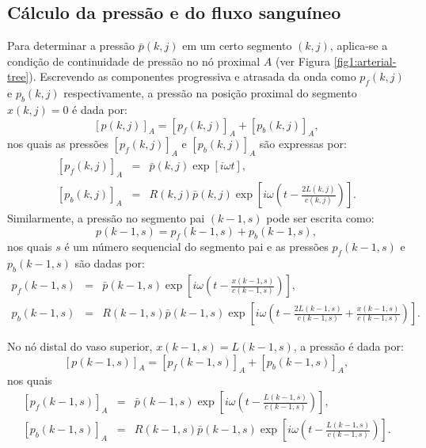 \documentclass[
        english,			
        brazil			        %
        ,<...>]{abntbibufjf}
\begin{document}
\subsection{Cálculo da pressão e do fluxo sanguíneo}\label{sec:pressao-fluxo}

Para determinar a pressão $\bar{p} (k,j)$ em um certo segmento $(k,j)$, aplica-se a condição de continuidade de pressão no nó proximal $A$ (ver Figura \ref{fig1:arterial-tree}). Escrevendo as componentes progressiva e atrasada da onda como $p_f (k,j)$ e $p_b (k,j)$ respectivamente, a pressão na posição proximal do segmento  $x(k,j) = 0$ é dada por:
\begin{equation}
\left[ p (k,j) \right]_A = \left[ p_f (k,j) \right]_A + \left[ p_b (k,j)\right]_A,
\label{09_p}
\end{equation}
nos quais as pressões $\left[ p_f(k,j) \right]_A$ e $\left[ p_b(k,j) \right]_A$ são expressas por:
\begin{eqnarray}
\left[ p_f(k,j) \right]_A &=& \bar{p}(k,j)\exp\left[ i\omega t\right],
\label{10_p_f}\\
\left[ p_b (k,j) \right]_A &=& R(k,j)\bar{p}(k,j)\exp\left[i\omega \left(t - \frac{2L(k,j)}{c(k,j)}\right) \right].
\label{11_p_b}
\end{eqnarray}
Similarmente, a pressão no segmento pai $(k-1,s)$ pode ser escrita como:
\begin{equation}
p(k-1,s) =  p_f(k-1,s) + p_b (k-1,s),
\label{12_p|_f}
\end{equation}
nos quais $s$ é um número sequencial do segmento pai e as pressões $ p_f (k-1,s)$ e $p_b (k-1,s)$ são dadas por:
\begin{eqnarray}
p_f (k-1,s) &=& \bar{p}(k-1,s)\exp\left[i\omega \left(t - \frac{x(k-1,s)}{c (k-1,s)}\right) \right],\\
\label{13_p_f}
p_b (k-1,s) &=& R (k-1,s)\bar{p}(k-1,s)\exp\left[ i\omega \left( t - \frac{2L(k-1,s)}{c(k-1,s)} + \frac{x(k-1,s)}{c(k-1,s)}\right) \right]. \nonumber
\end{eqnarray}

No nó distal do vaso superior, $x(k-1,s) = L(k-1,s)$, a pressão é dada por:
\begin{equation}
\left[ p(k-1,s) \right]_A = \left[ p_f(k-1,s)\right]_A + \left[ p_b(k-1,s) \right]_A,
\label{13_p|_f}
\end{equation}
nos quais 
\begin{eqnarray}
\left[ p_f(k-1,s) \right]_A &=& \bar{p}(k-1,s)\exp\left[ i\omega \left(t - \frac{L(k-1,s)}{c(k-1,s)}\right)\right],
\label{15_p_f}
\\
\left[ p_b(k-1,s) \right]_A &=& R(k-1,s)\bar{p}(k-1,s)\exp\left[i\omega \left( t - \frac{L(k-1,s)}{c(k-1,s)} \right) \right]. 
\label{16_p_b}
\end{eqnarray}
\end{document}
